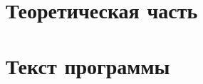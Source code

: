 \documentclass[10pt,a4paper]{report}
\begin{document}
	\renewcommand\bibname{Список литературы}
	
	
	
	\chapter{Теоретическая часть}
	
	
	
	
	\chapter{Текст программы}
	
	
\end{document}
